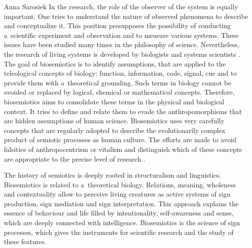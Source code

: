 \begin{artengenv}{Anna Sarosiek}
In the research, the role of the observer of the system is equally important. One tries to understand the nature of observed phenomena to describe and conceptualize it. This position presupposes the possibility of conducting a~scientific experiment and observation and to measure various systems. These issues have been studied many times in the philosophy of science. Nevertheless, the research of living systems is developed by biologists and systems scientists
\parencites[][]{kampis_self-modifying_1991}[][pp.63–78]{pattee_simulations_1989}[][]{rosen_fundamentals_1978}[][]{uexkull_semiotics_1984}. %
 The goal of biosemiotics is to identify assumptions, that are applied to the teleological concepts of biology: function, information, code, signal, cue and to provide them with a~theoretical grounding. Such terms in biology cannot be avoided or replaced by logical, chemical or mathematical concepts. Therefore, biosemiotics aims to consolidate these terms in the physical and biological context. It tries to define and relate them to evade the anthropomorphisms that are hidden assumptions of human science. Biosemiotics uses very carefully concepts that are regularly adopted to describe the evolutionarily complex product of semiotic processes as human culture. The efforts are made to avoid falsities of anthropocentrism or vitalism and distinguish which of these concepts are appropriate to the precise level of research 
\parencite[][]{tonnessen_biosemiosis_2013}.%


The history of semiotics is deeply rooted in structuralism and linguistics. Biosemiotics is related to a~theoretical biology. Relations, meaning, wholeness and contextuality allow to perceive living creatures as active systems of sign production, sign mediation and sign interpretation. This approach explains the essence of behaviour and life filled by intentionality, self-awareness and sense, which are deeply connected with intelligence. Biosemiotics is the science of sign processes, which gives the instruments for scientific research and the study of these features.


\end{artengenv}
